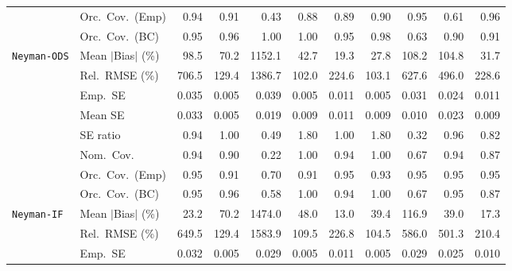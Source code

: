 \begin{landscape}
\begin{longtable}{llrrrrrrrrr}
 & Orc.\ Cov.\ (Emp) & \cellcolor{ranktwo}0.94 & \cellcolor{rankthree}0.91 & 0.43 & 0.88 & 0.89 & 0.90 & \cellcolor{rankone}0.95 & 0.61 & \cellcolor{ranktwo}0.96 \\
 & Orc.\ Cov.\ (BC) & \cellcolor{rankone}0.95 & \cellcolor{ranktwo}0.96 & 1.00 & 1.00 & \cellcolor{rankone}0.95 & \cellcolor{rankthree}0.98 & 0.63 & 0.90 & 0.91 \\
\addlinespace[2pt]
\quad \texttt{Neyman-ODS} & Mean $|$Bias$|$ (\%) & 98.5 & 70.2 & 1152.1 & 42.7 & \cellcolor{rankone}19.3 & \cellcolor{ranktwo}27.8 & 108.2 & 104.8 & \cellcolor{rankthree}31.7 \\
 & Rel.\ RMSE (\%) & 706.5 & \cellcolor{rankthree}129.4 & 1386.7 & \cellcolor{rankone}102.0 & 224.6 & \cellcolor{ranktwo}103.1 & 627.6 & 496.0 & 228.6 \\
 & Emp.\ SE & 0.035 & 0.005 & 0.039 & 0.005 & 0.011 & 0.005 & 0.031 & 0.024 & 0.011 \\
 & Mean SE & 0.033 & 0.005 & 0.019 & 0.009 & 0.011 & 0.009 & 0.010 & 0.023 & 0.009 \\
 & SE ratio & \cellcolor{rankthree}0.94 & \cellcolor{rankone}1.00 & 0.49 & 1.80 & \cellcolor{rankone}1.00 & 1.80 & 0.32 & \cellcolor{ranktwo}0.96 & 0.82 \\
 & Nom.\ Cov. & \cellcolor{rankone}0.94 & \cellcolor{ranktwo}0.90 & 0.22 & \cellcolor{ranktwo}1.00 & \cellcolor{rankone}0.94 & \cellcolor{ranktwo}1.00 & 0.67 & \cellcolor{rankone}0.94 & \cellcolor{rankthree}0.87 \\
 & Orc.\ Cov.\ (Emp) & \cellcolor{rankone}0.95 & \cellcolor{rankthree}0.91 & 0.70 & \cellcolor{rankthree}0.91 & \cellcolor{rankone}0.95 & \cellcolor{ranktwo}0.93 & \cellcolor{rankone}0.95 & \cellcolor{rankone}0.95 & \cellcolor{rankone}0.95 \\
 & Orc.\ Cov.\ (BC) & \cellcolor{rankone}0.95 & \cellcolor{ranktwo}0.96 & 0.58 & \cellcolor{rankthree}1.00 & \cellcolor{ranktwo}0.94 & \cellcolor{rankthree}1.00 & 0.67 & \cellcolor{rankone}0.95 & 0.87 \\
\addlinespace[2pt]
\quad \texttt{Neyman-IF} & Mean $|$Bias$|$ (\%) & \cellcolor{rankthree}23.2 & 70.2 & 1474.0 & 48.0 & \cellcolor{rankone}13.0 & 39.4 & 116.9 & 39.0 & \cellcolor{ranktwo}17.3 \\
 & Rel.\ RMSE (\%) & 649.5 & \cellcolor{rankthree}129.4 & 1583.9 & \cellcolor{ranktwo}109.5 & 226.8 & \cellcolor{rankone}104.5 & 586.0 & 501.3 & 210.4 \\
 & Emp.\ SE & 0.032 & 0.005 & 0.029 & 0.005 & 0.011 & 0.005 & 0.029 & 0.025 & 0.010 \\

\end{longtable}
\end{landscape}
